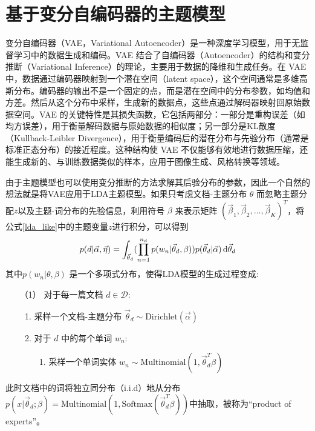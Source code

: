 \section{基于变分自编码器的主题模型}
变分自编码器\cite{VAE}（VAE，Variational Autoencoder）是一种深度学习模型，用于无监督学习中的数据生成和编码。VAE 结合了自编码器（Autoencoder）的结构和变分推断（Variational Inference）的理论，主要用于数据的降维和生成任务。在 VAE 中，数据通过编码器映射到一个潜在空间（latent space），这个空间通常是多维高斯分布。编码器的输出不是一个固定的点，而是潜在空间中的分布参数，如均值和方差。然后从这个分布中采样，生成新的数据点，这些点通过解码器映射回原始数据空间。VAE 的关键特性是其损失函数，它包括两部分：一部分是重构误差（如均方误差），用于衡量解码数据与原始数据的相似度；另一部分是KL散度（Kullback-Leibler Divergence），用于衡量编码后的潜在分布与先验分布（通常是标准正态分布）的接近程度。这种结构使 VAE 不仅能够有效地进行数据压缩，还能生成新的、与训练数据类似的样本，应用于图像生成、风格转换等领域。

由于主题模型也可以使用变分推断的方法求解其后验分布的参数，因此一个自然的想法就是将VAE应用于LDA主题模型。如果只考虑文档-主题分布 $\theta$ 而忽略主题分配$z$以及主题-词分布的先验信息，利用符号 $\beta$ 来表示矩阵 $(\vec\beta_1,\vec\beta_2,\dots,\vec\beta_K)^{T}$，将公式\ref{lda_like}中的主题变量$z$进行积分，可以得到
\begin{equation} 
	p(d|\vec\alpha,\vec\eta)=\int_{\vec\theta_d} (\prod_{n=1}^{n_d} p(w_n|\vec\theta_d,\beta))p(\vec\theta_d|\vec\alpha)\mathop{}\!\mathrm{d}\vec\theta_d
	\label{lda_like2}
\end{equation}
其中$p(w_n|\theta,\beta)$ 是一个多项式分布，使得LDA模型的生成过程变成:
\begin{enumerate}
	\item[（1）] 对于每一篇文档 $d \in \mathcal{D}$:
	    \begin{enumerate}
		    \item 采样一个文档-主题分布 $\vec\theta_d\sim \mbox{Dirichlet}(\vec\alpha)$
		    \item 对于 $d$ 中的每个单词 $w_{n}$:
		        \begin{enumerate}
			            \item 采样一个单词实体 $w_n\sim \mbox{Multinomial}(1,\vec\theta_d^{T}\beta)$
			        \end{enumerate}
		    \end{enumerate}
	\end{enumerate}
此时文档中的词将独立同分布（i.i.d）地从分布$p(x\vert\vec\theta_d;\beta)=\mbox{Multinomial}(1,\mbox{Softmax}(\vec\theta_d^{T}\beta))$中抽取，被称为“product of experts”\cite{AVITM}。

